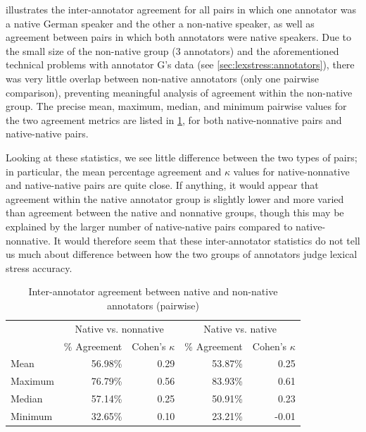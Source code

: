 		 illustrates the inter-annotator agreement for all pairs in which one annotator was a native German speaker and the other a non-native speaker, as well as agreement between pairs in which both annotators were native speakers. Due to the small size of the non-native group (3 annotators) and the aforementioned technical problems with annotator G's data (see \cref{sec:lexstress:annotators}), there was very little overlap between non-native annotators (only one pairwise comparison), preventing meaningful analysis of agreement within the non-native group. The precise mean, maximum, median, and minimum pairwise values for the two agreement metrics are listed in \cref{tab:agreement:L1}, for both  native-nonnative pairs and native-native pairs. 
		
		Looking at these statistics, we see little difference between the two types of pairs; in particular, the mean percentage agreement and $\kappa$ values for native-nonnative and native-native pairs are quite close. If anything, it would appear that agreement within the native annotator group is slightly lower and more varied than agreement between the native and nonnative groups, though this may be explained by the larger number of native-native pairs compared to native-nonnative. It would therefore seem that these inter-annotator statistics do not tell us much about difference between how the two groups of annotators judge lexical stress accuracy.
		
		
		\begin{table}[tb]
			\centering
			\caption{Inter-annotator agreement between native and non-native annotators (pairwise)}
			\begin{tabular}{lrrrr}
			\toprule
			& \multicolumn{2}{c}{Native vs. nonnative} & \multicolumn{2}{c}{Native vs. native} \\
			\cmidrule(lr){2-3} \cmidrule(lr){4-5}
			& \% Agreement & Cohen's $\kappa$ & \% Agreement & Cohen's $\kappa$  \\
			\midrule
Mean	&56.98\%	 & 0.29  & 53.87\%	& 0.25\\
Maximum&	76.79\%	& 0.56 & 83.93\%	 & 0.61\\
Median	& 57.14\%	 &0.25 &  50.91\%	& 0.23 \\
Minimum	&32.65\%	 & 0.10 &  23.21\% &	-0.01\\
			\bottomrule
			\end{tabular}
			\label{tab:agreement:L1}
		\end{table} 
		
